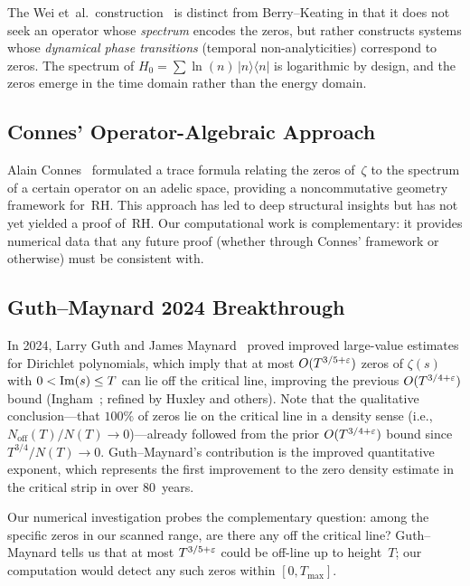 The Wei et~al.\ construction~\cite{wei2025} is distinct from Berry--Keating in that it
does not seek an operator whose \emph{spectrum} encodes the zeros, but rather constructs
systems whose \emph{dynamical phase transitions} (temporal non-analyticities) correspond
to zeros. The spectrum of $H_0 = \sum\ln(n)\,|n\rangle\langle n|$ is logarithmic by
design, and the zeros emerge in the time domain rather than the energy domain.


\subsection{Connes' Operator-Algebraic Approach}
\label{sec:connes}

Alain Connes~\cite{connes1999} formulated a trace formula relating the zeros of~$\zeta$
to the spectrum of a certain operator on an adelic space, providing a noncommutative
geometry framework for~RH. This approach has led to deep structural insights but has not
yet yielded a proof of~RH. Our computational work is complementary: it provides numerical
data that any future proof (whether through Connes' framework or otherwise) must be
consistent with.


\subsection{Guth--Maynard 2024 Breakthrough}
\label{sec:guth-maynard}

In 2024, Larry Guth and James Maynard~\cite{guthmaynard2024} proved improved large-value
estimates for Dirichlet polynomials, which imply that at most $O(T^{3/5+\varepsilon})$ zeros of
$\zeta(s)$ with $0 < \operatorname{Im}(s) \le T$ can lie off the critical line, improving the previous
$O(T^{3/4+\varepsilon})$ bound (Ingham~\cite{ingham1940}; refined by Huxley and others). Note
that the qualitative conclusion---that $100\%$ of zeros lie on the critical line in a
density sense (i.e., $N_{\mathrm{off}}(T)/N(T) \to 0$)---already followed from the prior
$O(T^{3/4+\varepsilon})$ bound since $T^{3/4}/N(T) \to 0$. Guth--Maynard's contribution is the
improved quantitative exponent, which represents the first improvement to the zero density
estimate in the critical strip in over $80$~years.

Our numerical investigation probes the complementary question: among the specific zeros
in our scanned range, are there any off the critical line? Guth--Maynard tells us that
at most $T^{3/5+\varepsilon}$ could be off-line up to height~$T$; our computation would detect
any such zeros within $[0, T_{\max}]$.


